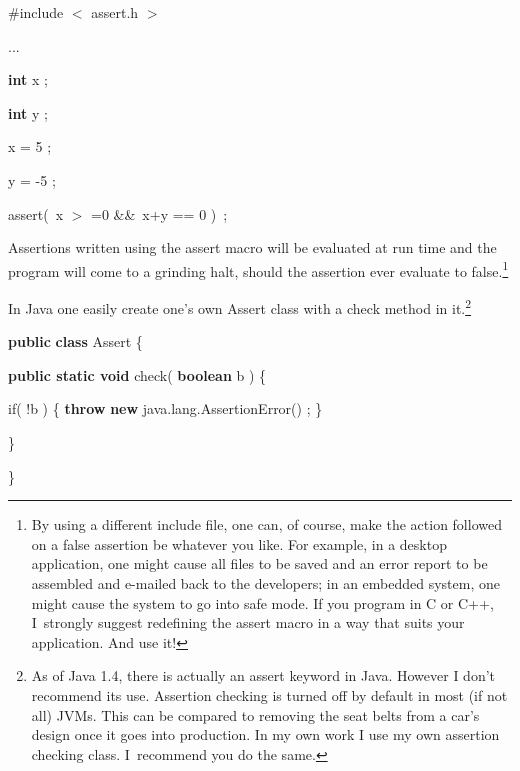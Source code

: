 \documentclass[11pt]{article}%
\begin{document}
\begin{code}
\#include
$<$%
assert.h%
$>$%


...

\textbf{int} x ;

\textbf{int} y ;

x = 5 ;

y = -5 ;

assert(\ x
$>$%
=0 \&\&\ x+y == 0 )\ ;
\end{code}

\noindent Assertions written using the \textsf{assert} macro will be evaluated
at run time and the program will come to a grinding halt, should the assertion
ever evaluate to false.\footnote{By using a different include file, one can,
of course, make the action followed on a false assertion be whatever you like.
For example, in a desktop application, one might cause all files to be saved
and an error report to be assembled and e-mailed back to the developers; in an
embedded system, one might cause the system to go into safe mode. If you
program in C or C++, I\ strongly suggest redefining the assert macro in a way
that suits your application. And use it!}

In Java one easily create one's own \textsf{Assert} class with a
\textsf{check} method in it.\footnote{As of Java 1.4, there is actually an
\textsf{assert} keyword in Java. However I don't recommend its use. Assertion
checking is turned off by default in most (if not all) JVMs. This can be
compared to removing the seat belts from a car's design once it goes into
production. In my own work I use my own assertion checking class. I\ recommend
you do the same.}

\begin{code}
\textbf{public} \textbf{class} Assert \{

\begin{indent}
\item \textbf{public static void} check( \textbf{boolean} b ) \{

\begin{indent}
\item if( !b ) \{ \textbf{throw} \textbf{new} java.lang.AssertionError() ; \}
\end{indent}

\item \}
\end{indent}

\}
\end{code}
\end{document}

